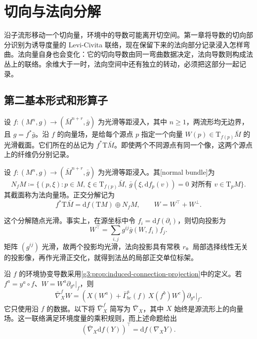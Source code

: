 
% 
% 

\section{切向与法向分解}
\label{g3:sec:0401}

沿子流形移动一个切向量，环境中的导数可能离开切空间。第一章将导数的切向部分识别为诱导度量的 Levi-Civita 联络，现在保留下来的法向部分记录浸入怎样弯曲。法向量自身也会变化：它的切向导数由同一弯曲数据决定，法向导数则构成法丛上的联络。余维大于一时，法向空间中还有独立的转动，必须把这部分一起记录。

\subsection{第二基本形式和形算子}
\label{g3:subsec:0401:01}

设 \(f:(M^n,g)\to(\bar M^{n+r},\bar g)\) 为光滑等距浸入，其中 \(n\ge1\)，两流形均无边界，且 \(g=f^*\bar g\)。沿 \(f\) 的向量场，是给每个源点 \(p\) 指定一个向量 \(W(p)\in\mathrm{T}_{f(p)}\bar M\) 的光滑截面。它们所在的丛记为 \(f^*\mathrm{T}\bar M\)。即使两个不同源点有同一个像，这两个源点上的纤维仍分别记录。

\begin{definition}\label{g3:def:normal-bundle}
	设 \(f:(M^n,g)\to(\bar M^{n+r},\bar g)\) 为光滑等距浸入。其[normal bundle]为
	\[
		N_fM\coloneqq
		\{(p,\xi):p\in M,\ \xi\in\mathrm{T}_{f(p)}\bar M,\
			\bar g(\xi,\mathrm df_p(v))=0
			\text{ 对所有 }v\in\mathrm{T}_pM\}.
	\]
	其截面称为法向量场。正交分解记为
	\[
		f^*\mathrm{T}\bar M=\mathrm df(\mathrm{T}M)\oplus N_fM,
		\qquad W=W^\top+W^\perp.
	\]
\end{definition}

这个分解随点光滑。事实上，在源坐标中令 \(f_i=\mathrm df(\partial_i)\)，则切向投影为
\[
	W^\top=\sum_{i,j}g^{ij}\bar g(W,f_i)f_j.
\]
矩阵 \((g^{ij})\) 光滑，故两个投影均光滑，法向投影具有常秩 \(r\)。局部选择线性无关的投影像，再作光滑正交化，就得到法丛的局部正交单位标架。

\ProseParagraphBreak

沿 \(f\) 的环境协变导数采用\cref{g3:prop:induced-connection-projection}中的定义。若 \(f^a=y^a\circ f\)、\(W=W^a\partial_{y^a}|_f\)，则
\[
	\bar\nabla^f_XW
	=\left(X(W^a)+\bar\Gamma^a_{bc}(f)\,X(f^b)W^c\right)
		\partial_{y^a}|_f.
\]
它只使用沿 \(f\) 的数据。以下将 \(\bar\nabla^f_X\) 简写为 \(\bar\nabla_X\)，其中 \(X\) 始终是源流形上的向量场。这一联络满足环境度量的乘积规则，而上述命题给出
\[
	(\bar\nabla_X\mathrm df(Y))^\top=\mathrm df(\nabla_XY).
\]

